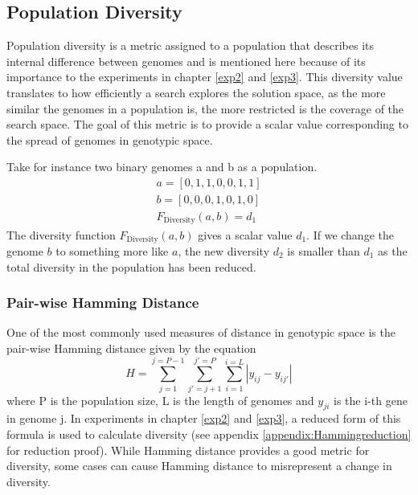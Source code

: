 \subsection{Population Diversity}
\label{background:diversity}
Population diversity is a metric assigned to a population that describes its internal difference between genomes and is mentioned here because of its importance to the experiments in chapter \ref{exp2} and \ref{exp3}. This diversity value translates to how efficiently a search explores the solution space, as the more similar the genomes in a population is, the more restricted is the coverage of the search space. The goal of this metric is to provide a scalar value corresponding to the spread of genomes in genotypic space. 

Take for instance two binary genomes a and b as a population.
\begin{equation*}
    \begin{split}
        a = [0, 1, 1, 0, 0, 1, 1]\\
        b = [0, 0, 0, 1, 0, 1, 0]\\
        F_{\text{Diversity}}(a, b)=d_{1}
    \end{split}
\end{equation*}
The diversity function \(F_{\text{Diversity}}(a, b)\) gives a scalar value \(d_{1}\). If we change the genome \(b\) to something more like \(a\), the new diversity \(d_{2}\) is smaller than \(d_{1}\) as the total diversity in the population has been reduced. 

\subsubsection{Pair-wise Hamming Distance}
One of the most commonly used measures of distance in genotypic space\cite{populationDiversity} is the pair-wise Hamming distance given by the equation 
\begin{equation}
    \label{eq:Hamming}
    H=\sum_{j=1}^{j=P-1}\sum_{{j}'=j+1}^{{j}'=P}\sum_{i=1}^{i=L}\left |y_{ij}-y_{i{j}'}\right |
\end{equation}
where P is the population size, L is the length of genomes and \(y_{ji}\) is the i-th gene in genome j. In experiments in chapter \ref{exp2} and \ref{exp3}, a reduced form of this formula is used to calculate diversity (see appendix \ref{appendix:Hammingreduction} for reduction proof). While Hamming distance provides a good metric for diversity, some cases can cause Hamming distance to misrepresent a change in diversity. 

